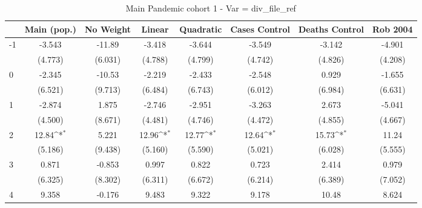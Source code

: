 \documentclass{article}
\begin{document}
{
\def\sym#1{\ifmmode^{#1}\else\(^{#1}\)\fi}
\begin{longtable}{l*{7}{c}}
\caption{Main Pandemic cohort 1 - Var = div\_file\_ref}\\
\hline\hline\endfirsthead\hline\endhead\hline\endfoot\endlastfoot
                &\multicolumn{1}{c}{Main (pop.)}&\multicolumn{1}{c}{No Weight}&\multicolumn{1}{c}{Linear}&\multicolumn{1}{c}{Quadratic}&\multicolumn{1}{c}{Cases Control}&\multicolumn{1}{c}{Deaths Control}&\multicolumn{1}{c}{Rob 2004}\\
\hline
-1              &   -3.543         &   -11.89         &   -3.418         &   -3.644         &   -3.549         &   -3.142         &   -4.901         \\
                &  (4.773)         &  (6.031)         &  (4.788)         &  (4.799)         &  (4.742)         &  (4.826)         &  (4.208)         \\
0               &   -2.345         &   -10.53         &   -2.219         &   -2.433         &   -2.548         &    0.929         &   -1.655         \\
                &  (6.521)         &  (9.713)         &  (6.484)         &  (6.743)         &  (6.012)         &  (6.984)         &  (6.631)         \\
1               &   -2.874         &    1.875         &   -2.746         &   -2.951         &   -3.263         &    2.673         &   -5.041         \\
                &  (4.500)         &  (8.671)         &  (4.481)         &  (4.746)         &  (4.472)         &  (4.855)         &  (4.667)         \\
2               &    12.84\sym{*}  &    5.221         &    12.96\sym{*}  &    12.77\sym{*}  &    12.64\sym{*}  &    15.73\sym{*}  &    11.24         \\
                &  (5.186)         &  (9.438)         &  (5.160)         &  (5.590)         &  (5.021)         &  (6.028)         &  (5.555)         \\
3               &    0.871         &   -0.853         &    0.997         &    0.822         &    0.723         &    2.414         &    0.979         \\
                &  (6.325)         &  (8.302)         &  (6.311)         &  (6.672)         &  (6.214)         &  (6.389)         &  (7.052)         \\
4               &    9.358         &   -0.176         &    9.483         &    9.322         &    9.178         &    10.48         &    8.624         \\

\end{longtable}}
\end{document}
